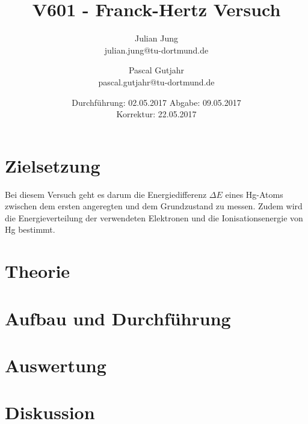 

\title{V601 - Franck-Hertz Versuch}
\author{Julian Jung \\ julian.jung@tu-dortmund.de
  \and Pascal Gutjahr \\ pascal.gutjahr@tu-dortmund.de}
  \date{Durchführung: 02.05.2017
  \hspace{3em}
  Abgabe: 09.05.2017 \\
  Korrektur: 22.05.2017}
  
\maketitle
\newpage
\tableofcontents
\newpage
\section{Zielsetzung}
Bei diesem Versuch geht es darum die Energiedifferenz $\Delta E$ eines Hg-Atoms
zwischen dem ersten angeregten und dem Grundzustand zu messen. Zudem wird
die Energieverteilung der verwendeten Elektronen und die Ionisationsenergie
von Hg bestimmt.
\section{Theorie}
  
\section{Aufbau und Durchführung}
  
\section{Auswertung}
 
\section{Diskussion}
 
\printbibliography

